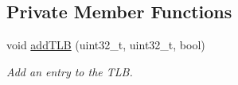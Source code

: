 \subsection*{\-Private \-Member \-Functions}
\begin{DoxyCompactItemize}
\item 
\hypertarget{classcMMU_a3344e754b5752bd079787ee5a7328bbf}{void \hyperlink{classcMMU_a3344e754b5752bd079787ee5a7328bbf}{add\-T\-L\-B} (uint32\-\_\-t, uint32\-\_\-t, bool)}\label{df/deb/classcMMU_a3344e754b5752bd079787ee5a7328bbf}

\begin{DoxyCompactList}\small\item\em \-Add an entry to the \-T\-L\-B. \end{DoxyCompactList}\end{DoxyCompactItemize}
